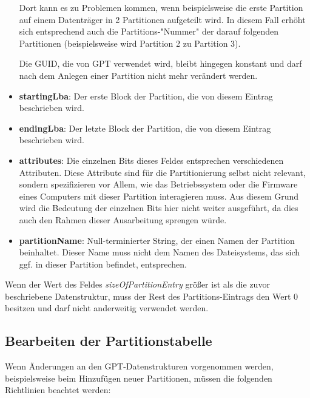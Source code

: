\begin{itemize}
    Dort kann es zu Problemen kommen, wenn beispielsweise die erste Partition auf einem Datenträger in 2 Partitionen aufgeteilt wird.
    In diesem Fall erhöht sich entsprechend auch die Partitions-"Nummer" der darauf folgenden Partitionen (beispielsweise wird Partition 2 zu Partition 3).
    
    Die GUID, die von GPT verwendet wird, bleibt hingegen konstant und darf nach dem Anlegen einer Partition nicht mehr verändert werden.

    \item \textbf{startingLba}:
    Der erste Block der Partition, die von diesem Eintrag beschrieben wird.

    \item \textbf{endingLba}:
    Der letzte Block der Partition, die von diesem Eintrag beschrieben wird.

    \newpage
    \item \textbf{attributes}:
    Die einzelnen Bits dieses Feldes entsprechen verschiedenen Attributen.
    Diese Attribute sind für die Partitionierung selbst nicht relevant, sondern spezifizieren vor Allem, wie das Betriebssystem oder die Firmware eines Computers mit dieser Partition interagieren muss.
    Aus diesem Grund wird die Bedeutung der einzelnen Bits hier nicht weiter ausgeführt, da dies auch den Rahmen dieser Ausarbeitung sprengen würde.
    
    \item \textbf{partitionName}:
    Null-terminierter String, der einen Namen der Partition beinhaltet.
    Dieser Name muss nicht dem Namen des Dateisystems, das sich ggf. in dieser Partition befindet, entsprechen.

\end{itemize}

Wenn der Wert des Feldes \textit{sizeOfPartitionEntry} größer ist als die zuvor beschriebene Datenstruktur, muss der Rest des Partitions-Eintrags den Wert 0 besitzen und darf nicht anderweitig verwendet werden.\cite{uefi-spec}

\subsection{Bearbeiten der Partitionstabelle}
Wenn Änderungen an den GPT-Datenstrukturen vorgenommen werden, beispielsweise beim Hinzufügen neuer Partitionen, müssen die folgenden Richtlinien beachtet werden:


